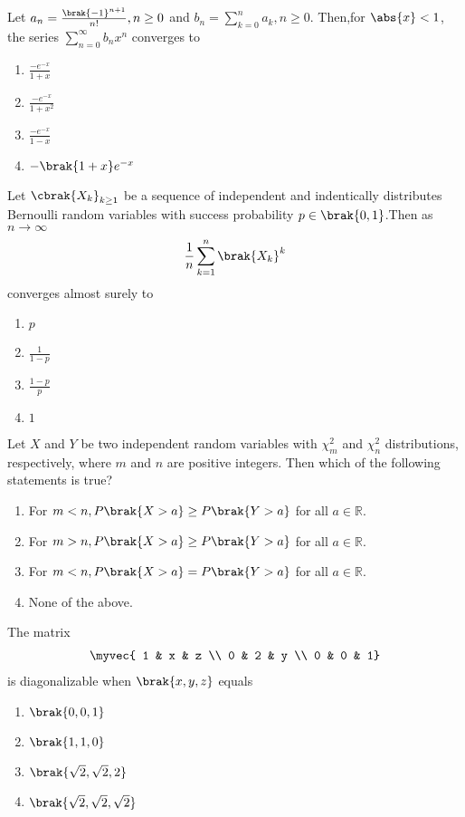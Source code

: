 \item Let $a_n = \frac{\brak{-1}^{n+1}}{n!} , n \geq 0$ and $b_n = \sum_{k=0}^n a_k , n \geq 0$. Then,for $\abs{x}<1$, the series $\sum_{n=0}^{\infty} b_n x^n$ converges to
\begin{multicols}{4}
\begin{enumerate}
    \item $\frac{-e^{-x}}{1+x}$
      \item $\frac{-e^{-x}}{1+x^2}$
        \item $\frac{-e^{-x}}{1-x}$
         \item $-\brak{1+x}e^{-x}$
\end{enumerate}
\end{multicols}
\item Let $\cbrak{X_k}_{k\geq 1}$ be a sequence of independent and indentically distributes Bernoulli random variables with success probability $p \in \brak{0,1}$.Then as $n \rightarrow \infty$
\begin{align}
    \frac{1}{n} \sum_{k=1}^n \brak{X_k}^k
\end{align}
converges almost surely to
\begin{multicols}{4}
\begin{enumerate}
    \item $p$
    \item $\frac{1}{1-p}$
    \item $\frac{1-p}{p}$
    \item $1$
\end{enumerate}
\end{multicols}
\item Let $X$ and $Y$ be two independent random variables with $\chi^2_m$ and $\chi^2_n$ distributions, respectively, where $m$ and $n$ are positive integers. Then which of the following statements is true?

\begin{enumerate}
    \item For $m < n, P\brak{X > a} \geq P\brak{Y > a}$ for all $a \in \mathbb{R}$.
    \item For $m > n, P\brak{X > a} \geq P\brak{Y > a}$ for all $a \in \mathbb{R}$.
    \item For $m < n, P\brak{X > a} = P\brak{Y > a}$ for all $a \in \mathbb{R}$.
    \item None of the above.
\end{enumerate}
\item The matrix
\begin{align}
\myvec{
1 & x & z \\
0 & 2 & y \\
0 & 0 & 1}
\end{align}
is diagonalizable when $\brak{x, y, z}$ equals

\begin{enumerate}
    \item $\brak{0, 0, 1}$
    \item $\brak{1, 1, 0}$
    \item $\brak{\sqrt{2}, \sqrt{2}, 2}$
    \item $\brak{\sqrt{2}, \sqrt{2}, \sqrt{2}}$
\end{enumerate}


